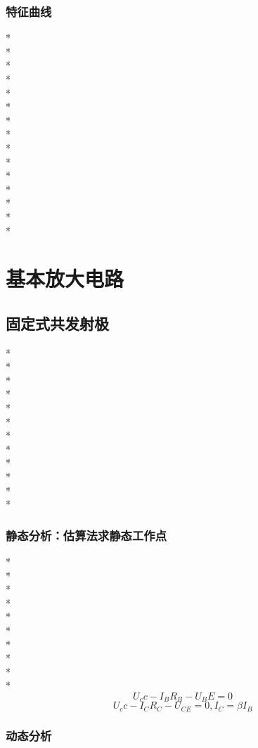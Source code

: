 \documentclass[UTF8, fontset=none]{ctexart}
\begin{document}
\begin{multicols*}{8}
\subsubsection{特征曲线}%
*\\
*\\
*\\
*\\
*\\
*\\
*\\
*\\
*\\
*\\
*\\
*\\
*\\
*\\
*


\section{基本放大电路}
\subsection{固定式共发射极}%
*\\
*\\
*\\
*\\
*\\
*\\
*\\
*\\
*\\
*\\
*\\
*
\subsubsection{静态分析：估算法求静态工作点}%
*\\
*\\
*\\
*\\
*\\
*\\
*\\
*\\
*\\
*
\[U_cc - I_B R_B - U_BE = 0\]
\[U_cc - I_C R_C - U_{CE} = 0, I_C = \beta I_B\]
\subsubsection{动态分析}

\end{multicols*}
\end{document}
